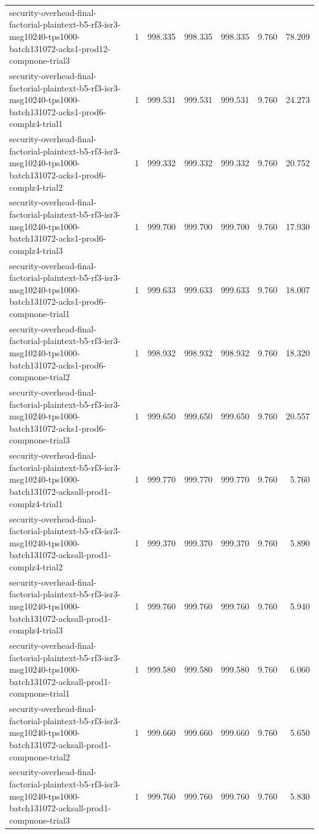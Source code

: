 \begin{tabular}{lrrrrrr}
security-overhead-final-factorial-plaintext-b5-rf3-isr3-msg10240-tps1000-batch131072-acks1-prod12-compnone-trial3 & 1 & 998.335 & 998.335 & 998.335 & 9.760 & 78.209 \\
security-overhead-final-factorial-plaintext-b5-rf3-isr3-msg10240-tps1000-batch131072-acks1-prod6-complz4-trial1 & 1 & 999.531 & 999.531 & 999.531 & 9.760 & 24.273 \\
security-overhead-final-factorial-plaintext-b5-rf3-isr3-msg10240-tps1000-batch131072-acks1-prod6-complz4-trial2 & 1 & 999.332 & 999.332 & 999.332 & 9.760 & 20.752 \\
security-overhead-final-factorial-plaintext-b5-rf3-isr3-msg10240-tps1000-batch131072-acks1-prod6-complz4-trial3 & 1 & 999.700 & 999.700 & 999.700 & 9.760 & 17.930 \\
security-overhead-final-factorial-plaintext-b5-rf3-isr3-msg10240-tps1000-batch131072-acks1-prod6-compnone-trial1 & 1 & 999.633 & 999.633 & 999.633 & 9.760 & 18.007 \\
security-overhead-final-factorial-plaintext-b5-rf3-isr3-msg10240-tps1000-batch131072-acks1-prod6-compnone-trial2 & 1 & 998.932 & 998.932 & 998.932 & 9.760 & 18.320 \\
security-overhead-final-factorial-plaintext-b5-rf3-isr3-msg10240-tps1000-batch131072-acks1-prod6-compnone-trial3 & 1 & 999.650 & 999.650 & 999.650 & 9.760 & 20.557 \\
security-overhead-final-factorial-plaintext-b5-rf3-isr3-msg10240-tps1000-batch131072-acksall-prod1-complz4-trial1 & 1 & 999.770 & 999.770 & 999.770 & 9.760 & 5.760 \\
security-overhead-final-factorial-plaintext-b5-rf3-isr3-msg10240-tps1000-batch131072-acksall-prod1-complz4-trial2 & 1 & 999.370 & 999.370 & 999.370 & 9.760 & 5.890 \\
security-overhead-final-factorial-plaintext-b5-rf3-isr3-msg10240-tps1000-batch131072-acksall-prod1-complz4-trial3 & 1 & 999.760 & 999.760 & 999.760 & 9.760 & 5.940 \\
security-overhead-final-factorial-plaintext-b5-rf3-isr3-msg10240-tps1000-batch131072-acksall-prod1-compnone-trial1 & 1 & 999.580 & 999.580 & 999.580 & 9.760 & 6.060 \\
security-overhead-final-factorial-plaintext-b5-rf3-isr3-msg10240-tps1000-batch131072-acksall-prod1-compnone-trial2 & 1 & 999.660 & 999.660 & 999.660 & 9.760 & 5.650 \\
security-overhead-final-factorial-plaintext-b5-rf3-isr3-msg10240-tps1000-batch131072-acksall-prod1-compnone-trial3 & 1 & 999.760 & 999.760 & 999.760 & 9.760 & 5.830 \\

\end{tabular}
